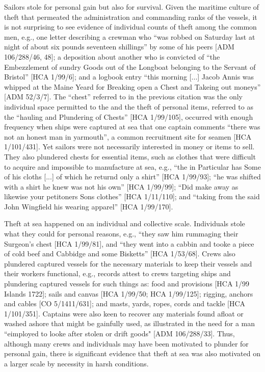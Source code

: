 Sailors stole for personal gain but also for survival. Given the maritime culture of theft that permeated the administration and commanding ranks of the vessels, it is not surprising to see evidence of individual counts of theft among the common men, e.g., one letter describing a crewman who “was robbed on Saturday last at night of about six pounds seventeen shillings” by some of his peers [ADM 106/288/46, 48]; a deposition about another  who is convicted of “the Embezzlement of sundry Goods out of the Longboat belonging to the Servant of Bristol” [HCA 1/99/6]; and a logbook entry “this morning [...] Jacob Annis was whipped at the Maine Yeard for Breaking open a Chest and Takeing out moneys” [ADM 52/3/7]. The “chest” referred to in the previous citation was the only individual space permitted to the  and the theft of personal items, referred to as the “hauling and Plundering of Chests” [HCA 1/99/105], occurred with enough frequency when ships were captured at sea that one captain comments “there was not an honest man in yarmouth”, a common recruitment site for seamen [HCA 1/101/431]. Yet sailors were not necessarily interested in money or items to sell. They also plundered chests for essential items, such as clothes that were difficult to acquire and impossible to manufacture at sea, e.g., “the  in Particular has Some of his cloths [...] of which he returnd only a shirt” [HCA 1/99/93]; “he was shifted with a shirt he knew was not his own” [HCA 1/99/99]; “Did make away as likewise your petitoners Sons clothes” [HCA 1/11/110]; and “taking from the said John Wingfield his wearing apparel” [HCA 1/99/170]. 

Theft at sea happened on an individual and collective scale. Individuals stole what they could for personal reasons, e.g., “they saw him rummaging their Surgeon’s chest [HCA 1/99/81], and “they went into a cabbin and tooke a piece of cold beef and Cabbidge and some Bisketts” [HCA 1/53/68]. Crews also plundered captured vessels for the necessary materials to keep their vessels and their workers functional, e.g., records attest to crews targeting ships and plundering captured vessels for such things as: food and provisions [HCA 1/99  Islands 1722]; sails and canvas [HCA 1/99/50; HCA 1/99/125]; rigging, anchors and cables [CO 5/1411/631]; and masts, yards, ropes, cords and tackle [HCA 1/101/351]. Captains were also keen to recover any materials found afloat or washed ashore that might be gainfully used, as illustrated in the need for a man “eimployed to looke after stolen or drift goods" [ADM 106/288/33]. Thus, although many crews and individuals may have been motivated to plunder for personal gain, there is significant evidence that theft at sea was also motivated on a larger scale by necessity in harsh conditions. 

